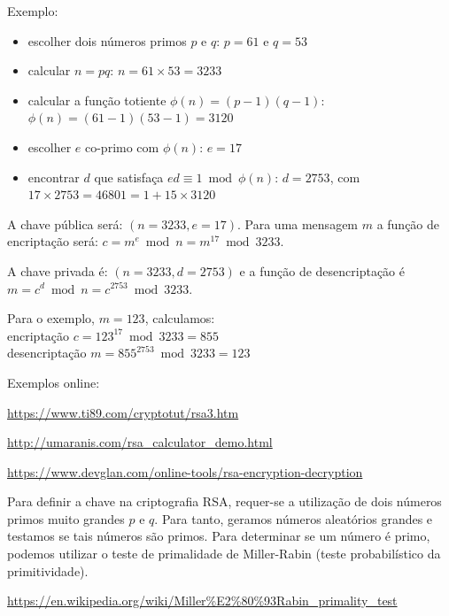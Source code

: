 \begin{frame}
\framebreak

Exemplo:
\begin{itemize}
\item escolher dois números primos $p$ e $q$: $p=61$ e $q=53$
\item calcular $n = pq$: $n = 61 \times 53 = 3233$
\item calcular a função totiente $\phi(n) = (p-1)(q-1)$: $\phi(n) = (61 - 1)(53 - 1) = 3120$
\item escolher $e$ co-primo com $\phi(n)$: $e = 17$
\item encontrar $d$ que satisfaça $e d \equiv 1 \bmod{\phi(n)}$: $d=2753$, com $17 \times 2753 = 46801 = 1 + 15 \times 3120$
\end{itemize}
A chave pública será: $(n=3233, e=17)$. Para uma mensagem $m$ a função de encriptação será: $c = m^e \bmod{n} = m^{17} \bmod 3233$.

A chave privada é: $(n=3233, d=2753)$ e a função de desencriptação é $m = c^d \bmod{n} = c^{2753} \bmod 3233$.

\vspace{2ex}
Para o exemplo, $m=123$, calculamos:\\
encriptação $c = 123^{17} \bmod 3233 = 855$\\
desencriptação $m = 855^{2753} \bmod 3233 = 123$

\framebreak

Exemplos online:

\url{https://www.ti89.com/cryptotut/rsa3.htm} 

\url{http://umaranis.com/rsa_calculator_demo.html} 

\url{https://www.devglan.com/online-tools/rsa-encryption-decryption}


\framebreak

Para definir a chave na criptografia RSA, requer-se a utilização de dois números primos muito grandes $p$ e $q$.
Para tanto, geramos números aleatórios grandes e testamos se tais números são primos. Para determinar se um número
é primo, podemos utilizar o teste de primalidade de Miller-Rabin (teste probabilístico da primitividade).

\url{https://en.wikipedia.org/wiki/Miller\%E2\%80\%93Rabin\_primality\_test}

\framebreak


\end{frame}
